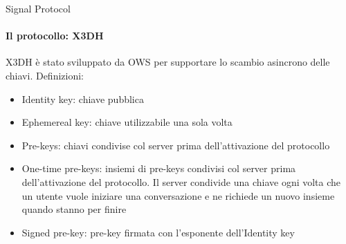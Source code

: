 \begin{frame}{Signal Protocol}
    \framesubtitle{Il protocollo: X3DH}
    X3DH è stato sviluppato da OWS per supportare lo scambio asincrono delle chiavi. \cite{X3DH}\pause\newline
    Definizioni:
    \begin{itemize}
        \item Identity key: chiave pubblica\pause
        \item Ephemereal key: chiave utilizzabile una sola volta \pause
        \item Pre-keys: chiavi condivise col server prima dell'attivazione del protocollo\pause
        \item One-time pre-keys: insiemi di pre-keys condivisi col server prima dell'attivazione del protocollo. Il server condivide una chiave ogni volta che un utente vuole iniziare una conversazione e ne richiede un nuovo insieme quando stanno per finire\pause
        \item Signed pre-key: pre-key firmata con l'esponente dell'Identity key
    \end{itemize}

\end{frame}

